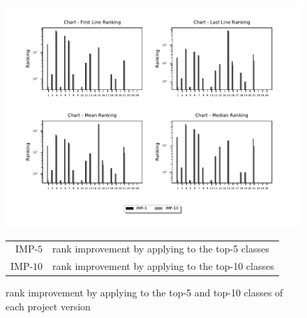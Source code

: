 \documentclass{article}
\begin{document}
\begin{appendices}
	\begin{figure}
		\centering
		\includegraphics[width=\textwidth]{figures/Chart_abs_imp.pdf}
		\caption{\sfl{} rank improvement by applying \ds{} to the top-5 and top-10 classes of each project version}
		\begin{tabular}{r@{: }l}
			IMP-$5$& \sfl{} rank improvement by applying \ds{} to the top-5 classes \\
			IMP-$10$& \sfl{} rank improvement by applying \ds{} to the top-10 classes
		\end{tabular}
		\label{fig:performance}
	\end{figure}

\end{appendices}
\end{document}
